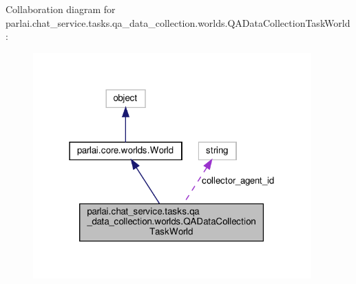 Collaboration diagram for parlai.\+chat\+\_\+service.\+tasks.\+qa\+\_\+data\+\_\+collection.\+worlds.\+Q\+A\+Data\+Collection\+Task\+World\+:
\nopagebreak
\begin{figure}[H]
\begin{center}
\leavevmode
\includegraphics[width=303pt]{d4/d14/classparlai_1_1chat__service_1_1tasks_1_1qa__data__collection_1_1worlds_1_1QADataCollectionTaskWorld__coll__graph}
\end{center}
\end{figure}
